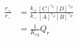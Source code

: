 \begin{eqnarray}
\frac{r_+}{r_-} & = \frac{k_+}{k_-}\frac{[C]^{\gamma_C}[D]^{\gamma_D}}{[A]^{\gamma_A}[B]^{\gamma_B}} \\
&  =  \frac{1}{K_{eq}}Q_r \\
\end{eqnarray}